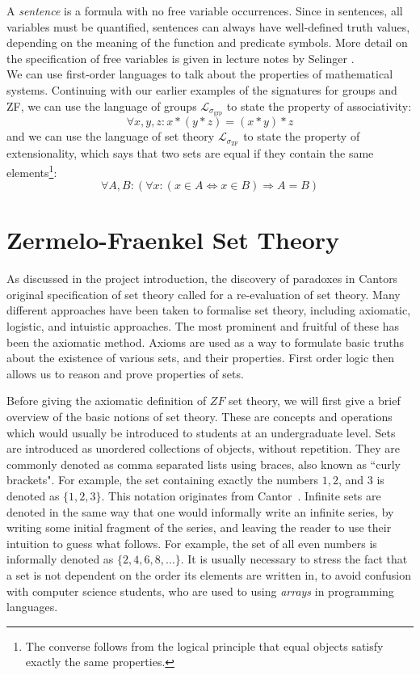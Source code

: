 \documentclass[11pt]{report}
\theoremstyle{definition}
\theoremstyle{theorem}
\theoremstyle{lemma}
\begin{document}
A \emph{sentence} is a formula with no free variable occurrences.
Since in sentences, all variables must be quantified, sentences can always have well-defined truth values, depending on the meaning of the function and predicate symbols.
More detail on the specification of free variables is given in lecture notes by Selinger \cite[ch.~1.9]{selinger}.\\

\noindent
We can use first-order languages to talk about the properties of mathematical systems.
Continuing with our earlier examples of the signatures for groups and ZF, we can use the language of groups $\mathcal{L}_{\sigma_{\text{grp}}}$ to state the property of associativity:
$$\forall x,y,z: x*(y*z) = (x*y)*z$$
and we can use the language of set theory $\mathcal{L}_{\sigma_{\text{ZF}}}$ to state the property of extensionality, which says that two sets are equal if they contain the same elements\footnote{The converse follows from the logical principle that equal objects satisfy exactly the same properties.}:
$$\forall A,B: (\forall x:(x\in A \Leftrightarrow x\in B) \Rightarrow A = B)$$

\section{Zermelo-Fraenkel Set Theory}
As discussed in the project introduction, the discovery of paradoxes in Cantors original specification of set theory called for a re-evaluation of set theory.
Many different approaches have been taken to formalise set theory, including axiomatic, logistic, and intuistic approaches.
The most prominent and fruitful of these has been the axiomatic method.
Axioms are used as a way to formulate basic truths about the existence of various sets, and their properties.
First order logic then allows us to reason and prove properties of sets.

Before giving the axiomatic definition of $\mathit{ZF}$ set theory, we will first give a brief overview of the basic notions of set theory.
These are concepts and operations which would usually be introduced to students at an undergraduate level.
Sets are introduced as unordered collections of objects, without repetition.
They are commonly denoted as comma separated lists using braces, also known as ``curly brackets". 
For example, the set containing exactly the numbers $1,2$, and $3$ is denoted as $\{1,2,3\}$. 
This notation originates from Cantor~\cite{cantor}.
Infinite sets are denoted in the same way that one would informally write an infinite series, by writing some initial fragment of the series, and leaving the reader to use their intuition to guess what follows. 
For example, the set of all even numbers is informally denoted as $\{2,4,6,8,\ldots\}$.
It is usually necessary to stress the fact that a set is not dependent on the order its elements are written in, to avoid confusion with computer science students, who are used to using \emph{arrays} in programming languages.  
\end{document}
